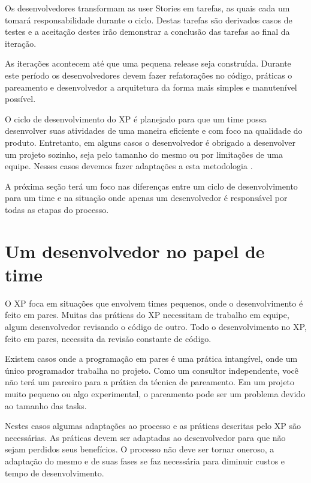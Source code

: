 Os desenvolvedores transformam as user Stories em tarefas, as quais cada um tomará responsabilidade durante o ciclo. Destas tarefas são derivados casos de testes e a aceitação  destes irão demonstrar a conclusão das tarefas ao final da iteração. \cite{Beck:1999}

As iterações acontecem até que uma pequena release seja construída. Durante este período os desenvolvedores devem fazer refatorações no código, práticas o pareamento e desenvolvedor a arquitetura da forma mais simples e manutenível possível. \cite{Beck:2004}

O ciclo de desenvolvimento do XP é planejado para que um time possa desenvolver suas atividades de uma maneira eficiente e com foco na qualidade do produto. Entretanto, em alguns casos o desenvolvedor é obrigado a desenvolver um projeto sozinho, seja pelo tamanho do mesmo ou por limitações de uma equipe. Nesses casos devemos fazer adaptações a esta metodologia .

A próxima seção terá um foco nas diferenças entre um ciclo de desenvolvimento para um time e na situação onde apenas um desenvolvedor é responsável por todas as etapas do processo.

\section{Um desenvolvedor no papel de time}

O XP foca em situações que envolvem times pequenos, onde o desenvolvimento é feito em pares. Muitas das práticas do XP necessitam de trabalho em equipe, algum desenvolvedor revisando o código de outro. Todo o desenvolvimento no XP, feito em pares, necessita da revisão constante de código. \cite{Ron:2000}

Existem casos onde a programação em pares é uma prática intangível, onde um único programador trabalha no projeto. Como um consultor independente, você não terá um parceiro para a prática da técnica de pareamento. Em um projeto muito pequeno ou algo experimental, o pareamento pode ser um problema devido ao tamanho das tasks. \cite{Agarwal:2008}

Nestes casos algumas adaptações ao processo e as práticas descritas pelo XP são necessárias. As práticas devem ser adaptadas ao desenvolvedor para que não sejam perdidos seus benefícios. O processo não deve ser tornar oneroso, a adaptação do mesmo e de suas fases se faz necessária para diminuir custos e tempo de desenvolvimento. \cite{Bernabe:2015}

